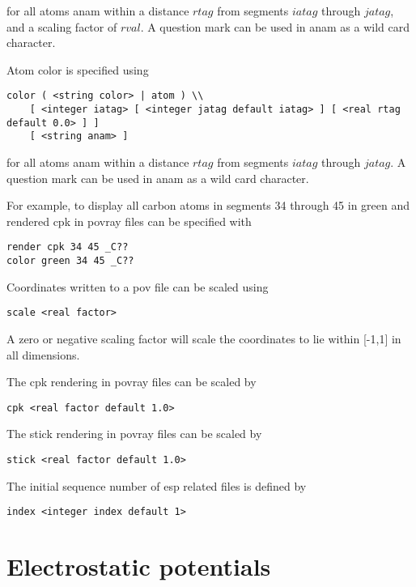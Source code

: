 for all atoms anam within a distance $rtag$ from segments $iatag$ through $jatag$,
and a scaling factor of $rval$. A question mark can be used in anam as a wild card 
character.
\par

Atom color is specified using

\begin{verbatim}
color ( <string color> | atom ) \\
    [ <integer iatag> [ <integer jatag default iatag> ] [ <real rtag default 0.0> ] ]
    [ <string anam> ]
\end{verbatim}

for all atoms anam within a distance $rtag$ from segments $iatag$ through $jatag$.
A question mark can be used in anam as a wild card character.
\par
For example, to display all carbon atoms in segments 34 through 45 
in green and rendered cpk in povray files can be specified with

\begin{verbatim}
render cpk 34 45 _C??
color green 34 45 _C??
\end{verbatim}

Coordinates written to a pov file can be scaled using

\begin{verbatim}
scale <real factor>
\end{verbatim}

A zero or negative scaling factor will scale the coordinates to
lie within [-1,1] in all dimensions.
\par
The cpk rendering in povray files can be scaled by

\begin{verbatim}
cpk <real factor default 1.0>
\end{verbatim}
\par

The stick rendering in povray files can be scaled by

\begin{verbatim}
stick <real factor default 1.0>
\end{verbatim}

The initial sequence number of esp related files is defined by

\begin{verbatim}
index <integer index default 1>
\end{verbatim}

\section{Electrostatic potentials}

